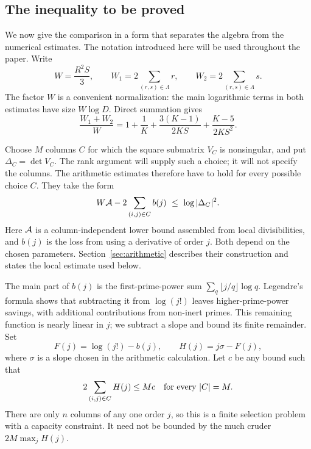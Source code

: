 \subsection{The inequality to be proved}
\label{subsec:central}
We now give the comparison in a form that separates the algebra from the numerical estimates. The notation introduced here will be used throughout the paper. Write
\begin{equation}\label{eq:normalization}
 W=\frac{R^2S}{3},\qquad
 W_1=2\sum_{(r,s)\in\Lambda}r,\qquad
 W_2=2\sum_{(r,s)\in\Lambda}s.
\end{equation}
The factor $W$ is a convenient normalization: the main logarithmic terms in both estimates have size $W\log D$. Direct summation gives
\begin{equation}\label{eq:radius-coefficient}
 \frac{W_1+W_2}{W}
 =1+\frac1K+\frac{3(K-1)}{2KS}+\frac{K-5}{2KS^2}.
\end{equation}

Choose $M$ columns $C$ for which the square submatrix $V_C$ is nonsingular, and put $\Delta_C=\det V_C$. The rank argument will supply such a choice; it will not specify the columns. The arithmetic estimates therefore have to hold for every possible choice $C$. They take the form
\begin{equation}\label{eq:arithmetic-interface}
 W\mathcal A-2\sum_{(i,j)\in C} b(j)\ \leq\ \log|\Delta_C|^2.
\end{equation}
Here $\mathcal A$ is a column-independent lower bound assembled from local divisibilities, and $b(j)$ is the loss from using a derivative of order $j$. Both depend on the chosen parameters. Section~\ref{sec:arithmetic} describes their construction and states the local estimate used below.

The main part of $b(j)$ is the first-prime-power sum
$\sum_q\lfloor j/q\rfloor\log q$. Legendre's formula shows that subtracting
it from $\log(j!)$ leaves higher-prime-power savings, with additional
contributions from non-inert primes. This remaining function is
nearly linear in $j$; we subtract a slope and bound its finite remainder. Set
\begingroup{}
\begin{equation}\label{eq:F-H}
 F(j)=\log(j!)-b(j),\qquad H(j)=j\sigma-F(j),
\end{equation}
\endgroup
where $\sigma$ is a slope chosen in the arithmetic calculation. Let $c$ be any bound such that
\begin{equation}\label{eq:column-remainder}
 2\sum_{(i,j)\in C}H(j)\leq Mc
 \quad\hbox{for every }|C|=M.
\end{equation}
There are only $n$ columns of any one order $j$, so this is a finite selection problem with a capacity constraint. It need not be bounded by the much cruder $2M\max_jH(j)$.

